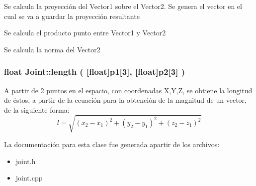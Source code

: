 \-Se calcula la proyección del \-Vector1 sobre el \-Vector2. \-Se genera el vector en el cual se va a guardar la proyección resultante

\-Se calcula el producto punto entre \-Vector1 y \-Vector2

\-Se calcula la norma del \-Vector2 \hypertarget{class_joint_a1b4c78e285a1d96bbde889d4979828fa}{
\subsubsection[{length}]{\setlength{\rightskip}{0pt plus 5cm}float {\bf \-Joint\-::length} (
[{float}]{p1\mbox{[}3\mbox{]}, }
[{float}]{p2\mbox{[}3\mbox{]}}
)}}\label{class_joint_a1b4c78e285a1d96bbde889d4979828fa}


\-A partir de 2 puntos en el espacio, con coordenadas X,Y,Z, se obtiene la longitud de éstos, a partir de la ecuación para la obtención de la magnitud de un vector, de la siguiente forma:
\begin{equation}
l=\sqrt{\left ( x_{2}- x_{1} \right )^{2}+\left ( y_{2}- y_{1} \right )^{2}+\left ( z_{2}- z_{1} \right )^{2}}
\end{equation}

\-La documentación para esta clase fue generada apartir de los archivos\-:\begin{itemize}
\item 
joint.\-h\item 
joint.\-cpp\end{itemize}
